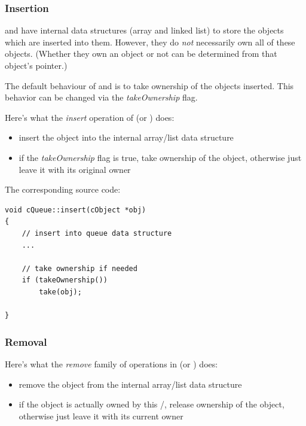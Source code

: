 \subsubsection{Insertion}

 and  have internal data structures
(array and linked list) to store the objects which are inserted
into them. However, they do \textit{not} necessarily own all of these
objects.  (Whether they own an object or not can be determined
from that object's  pointer.)

The default behaviour of  and  is
to take ownership of the objects inserted.
This behavior can be changed via the \textit{takeOwnership} flag.

Here's what the \textit{insert} operation of  (or ) does:
\begin{itemize}
    \item{insert the object into the internal array/list data structure}

    \item{if the \textit{takeOwnership} flag is true, take ownership
    of the object, otherwise just leave it with its original owner}
\end{itemize}

The corresponding source code:

\begin{verbatim}
void cQueue::insert(cObject *obj)
{
    // insert into queue data structure
    ...

    // take ownership if needed
    if (takeOwnership())
        take(obj);

}
\end{verbatim}


\subsubsection{Removal}

Here's what the \textit{remove} family of operations in 
(or ) does:

\begin{itemize}
    \item{remove the object from the internal array/list data structure}

    \item{if the object is actually owned by this /,
    release ownership of the object, otherwise just leave it with
    its current owner}
\end{itemize}

